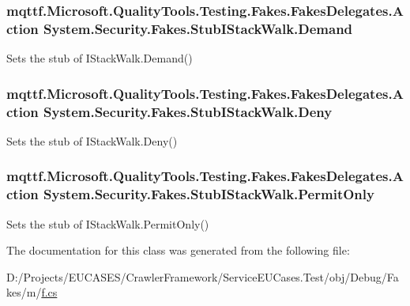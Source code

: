 \hypertarget{class_system_1_1_security_1_1_fakes_1_1_stub_i_stack_walk_a6e90566190e7a191849a85baefe72c35}{
\subsubsection[{Demand}]{\setlength{\rightskip}{0pt plus 5cm}mqttf.\-Microsoft.\-Quality\-Tools.\-Testing.\-Fakes.\-Fakes\-Delegates.\-Action System.\-Security.\-Fakes.\-Stub\-I\-Stack\-Walk.\-Demand}}\label{class_system_1_1_security_1_1_fakes_1_1_stub_i_stack_walk_a6e90566190e7a191849a85baefe72c35}


Sets the stub of I\-Stack\-Walk.\-Demand()

\hypertarget{class_system_1_1_security_1_1_fakes_1_1_stub_i_stack_walk_ae706b00c65a996b83a997dc19630d49c}{
\subsubsection[{Deny}]{\setlength{\rightskip}{0pt plus 5cm}mqttf.\-Microsoft.\-Quality\-Tools.\-Testing.\-Fakes.\-Fakes\-Delegates.\-Action System.\-Security.\-Fakes.\-Stub\-I\-Stack\-Walk.\-Deny}}\label{class_system_1_1_security_1_1_fakes_1_1_stub_i_stack_walk_ae706b00c65a996b83a997dc19630d49c}


Sets the stub of I\-Stack\-Walk.\-Deny()

\hypertarget{class_system_1_1_security_1_1_fakes_1_1_stub_i_stack_walk_a636ea81a4182eccb52323010dea8a2c1}{
\subsubsection[{Permit\-Only}]{\setlength{\rightskip}{0pt plus 5cm}mqttf.\-Microsoft.\-Quality\-Tools.\-Testing.\-Fakes.\-Fakes\-Delegates.\-Action System.\-Security.\-Fakes.\-Stub\-I\-Stack\-Walk.\-Permit\-Only}}\label{class_system_1_1_security_1_1_fakes_1_1_stub_i_stack_walk_a636ea81a4182eccb52323010dea8a2c1}


Sets the stub of I\-Stack\-Walk.\-Permit\-Only()



The documentation for this class was generated from the following file\-:\begin{DoxyCompactItemize}
\item 
D\-:/\-Projects/\-E\-U\-C\-A\-S\-E\-S/\-Crawler\-Framework/\-Service\-E\-U\-Cases.\-Test/obj/\-Debug/\-Fakes/m/\hyperlink{m_2f_8cs}{f.\-cs}\end{DoxyCompactItemize}
